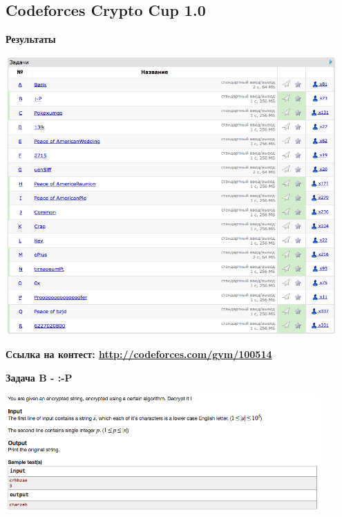 \documentclass[a4paper,12pt]{article}
\begin{document}
%
%
\newpage
\subsection{Codeforces Crypto Cup 1.0}

\textbf{{\large Результаты}} \\
\begin{center}
\includegraphics[width=0.95\textwidth]{CT_Crypto/CT_Crypto_result.png}\\ [1cm]
\end{center}

\textbf{{\large Ссылка на контест: \url{http://codeforces.com/gym/100514}}}

\newpage
\textbf{{\large Задача B - :-P}}

\begin{center}
\includegraphics[width=0.9\textwidth]{CT_Crypto/CT_Crypto_B.png}\\ [1cm]
\end{center}
\end{document}
